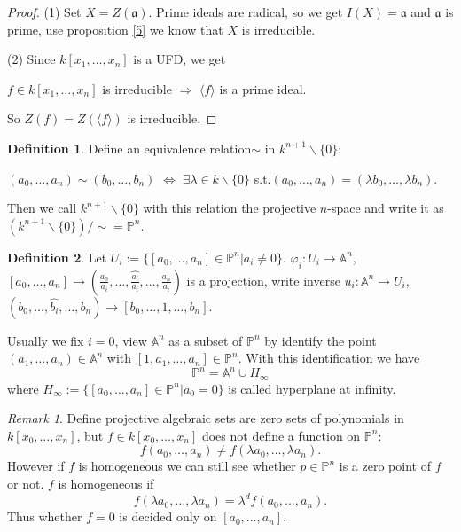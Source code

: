 \documentclass{amsart}
\theoremstyle{plain}
\theoremstyle{definition}
\newtheorem{definition}{Definition}
\theoremstyle{remark}
\newtheorem*{remark}{Remark}
\numberwithin{equation}{section}
\begin{document}
  \begin{proof}
  	(1) Set $ X=Z(\mathfrak{a}) $. Prime ideals are radical, so we get $ I(X)=\mathfrak{a} $ and $ \mathfrak{a} $ is prime, use proposition \ref{5} we know that $ X $ is irreducible.
  	
  	(2) Since $ k[x_1,\dots,x_n] $ is a UFD, we get
  	\begin{center}
  		$ f\in k[x_1,\dots,x_n] $ is irreducible $ \Rightarrow $ $ \langle f\rangle $ is a prime ideal.
  	\end{center}
  	So $ Z(f)=Z(\langle f\rangle) $ is irreducible.
  \end{proof}
  
 
  \begin{definition}
  	Define an equivalence relation$ \sim $ in $ k^{n+1}\backslash \{0\} $:
  	\begin{center}
  		$ (a_0,\dots,a_n)\sim(b_0,\dots,b_n) $ $ \Leftrightarrow $ $ \exists \lambda\in k\backslash \{0\} $ s.t.$ (a_0,\dots,a_n) = (\lambda b_0,\dots,\lambda b_n)$.
  	\end{center}
  	Then we call $  k^{n+1}\backslash \{0\} $ with this relation the projective $ n $-space and write it as $ (k^{n+1}\backslash\{0\})/\sim = \mathbb{P}^n $.
  \end{definition}
  \begin{definition}
  	Let $ U_i:=\{[a_0,\dots,a_n]\in \mathbb{P}^n|a_i\neq 0 \} $. $ \varphi_i: U_i\to \mathbb{A}^n $, $ [a_0,\dots,a_n]\to (\frac{a_0}{a_i},\dots,\hat{\frac{a_i}{a_i}},\dots,\frac{a_n}{a_i}) $ is a projection, write inverse $ u_i:\mathbb{A}^n\to U_i $, $ (b_0,\dots,\hat{b_i},\dots,b_n)\to [b_0,\dots,1,\dots,b_n] $.
  	
  	Usually we fix $ i=0 $, view $ \mathbb{A}^n $ as a subset of $ \mathbb{P}^n $ by identify the point $ (a_1,\dots,a_n)\in\mathbb{A}^n $ with $ [1,a_1,\dots,a_n]\in \mathbb{P}^n $. With this identification we have
  	\begin{equation}
  	\mathbb{P}^n=\mathbb{A}^n\cup H_{\infty}
  	\end{equation}
  	where $ H_{\infty} :=\{ [a_0,\dots,a_n]\in \mathbb{P}^n|a_0=0 \} $ is called hyperplane at infinity.
  \end{definition}
  \begin{remark}
  	Define projective algebraic sets are zero sets of polynomials in $ k[x_0,\dots,x_n] $, but $ f\in k[x_0,\dots,x_n] $ does not define a function on $ \mathbb{P}^n $:
  	\begin{equation}
  	f(a_0,\dots,a_n)\neq f(\lambda a_0,\dots,\lambda a_n).
  	\end{equation}
  	However if $ f $ is homogeneous we can still see whether $ p\in \mathbb{P}^n $ is a zero point of $ f $ or not. $ f $ is homogeneous if
  	\begin{equation}
  	f(\lambda a_0,\dots,\lambda a_n)=\lambda^d f(a_0,\dots,a_n).
  	\end{equation}
  	Thus whether $ f=0 $ is decided only on $ [a_0,\dots,a_n] $.
  \end{remark}
\end{document}
